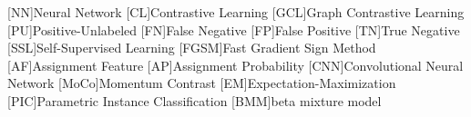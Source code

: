 \begin{acronym}

    [NN]{Neural Network}
    [CL]{Contrastive Learning}
    [GCL]{Graph Contrastive Learning}
    [PU]{Positive-Unlabeled}
    [FN]{False Negative}
    [FP]{False Positive}
    [TN]{True Negative}
    [SSL]{Self-Supervised Learning}
    [FGSM]{Fast Gradient Sign Method}
    [AF]{Assignment Feature}
    [AP]{Assignment Probability}
    [CNN]{Convolutional Neural Network}
    [MoCo]{Momentum Contrast}
    [EM]{Expectation-Maximization}
    [PIC]{Parametric Instance Classification}
    [BMM]{beta mixture model}

\end{acronym}